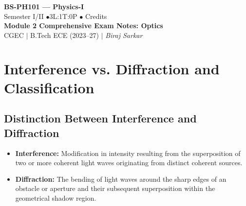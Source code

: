 \documentclass[12pt,a4paper]{article}
\begin{document}
\begin{center}
  {\LARGE\bfseries\color{myred} BS-PH101 --- Physics-I}\\[5pt]
  {\normalsize\color{mydark} Semester I/II \quad$\bullet$\quad 3L:1T:0P \quad$\bullet$ Credits}\\[3pt]
  {\normalsize\color{myteal}\textbf{Module 2 Comprehensive Exam Notes: Optics}}\\[3pt]
  {\small\color{mydark} CGEC \;$|$\; B.Tech ECE (2023--27) \;$|$\; \textit{Biraj Sarkar}}
\end{center}
\vspace{2pt}
\noindent{\color{myred}\rule{\linewidth}{1.5pt}}
\vspace{2pt}
\hypersetup{linkcolor=mydark}
\tableofcontents
\hypersetup{linkcolor=myteal}
\newpage

\section{Interference vs. Diffraction and Classification}

\subsection{Distinction Between Interference and Diffraction}

\begin{tcolorbox}[defbox, title={\textbf{Definition: Interference and Diffraction}}]
\begin{itemize}[leftmargin=*, itemsep=2pt]
  \item \textbf{Interference:} Modification in intensity resulting from the superposition of two or more coherent light waves originating from distinct coherent sources.
  \item \textbf{Diffraction:} The bending of light waves around the sharp edges of an obstacle or aperture and their subsequent superposition within the geometrical shadow region.
\end{itemize}
\end{tcolorbox}
\end{document}
